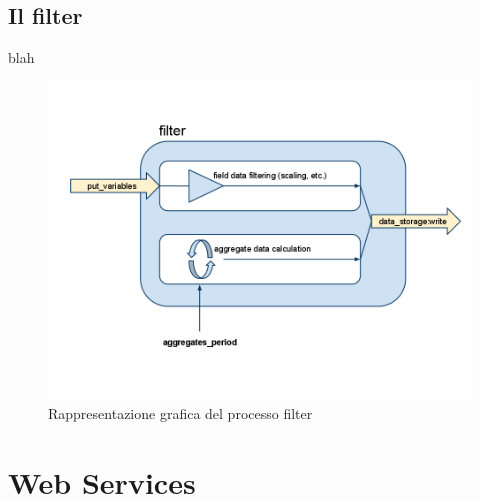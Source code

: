 \subsection{Il filter}
%
blah
\begin{figure}[!h]
\centering
\includegraphics[width=380pt]{img/filter.png}
\caption{Rappresentazione grafica del processo filter}
\label{filter}
\end{figure}
%


\section{Web Services}
